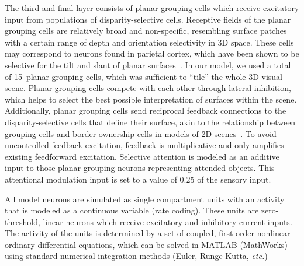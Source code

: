 \documentclass[conference]{IEEEtran}
\newcommand{\etc}[0]{{\em etc.}\xspace}
\begin{document}
The third and final layer consists of planar grouping cells which
receive excitatory input from populations of disparity-selective
cells. Receptive fields of the planar grouping cells are relatively broad and non-specific, resembling surface patches with a certain range of depth and orientation selectivity in 3D space.
These cells may correspond to neurons found 
in parietal cortex, which have been shown to be selective for the tilt
and slant of planar surfaces~\cite{Rosenberg_etal13}. In our model, we
used a total of 15~planar grouping cells, which was sufficient to ``tile''
the whole 3D visual scene. Planar grouping cells compete with each
other through lateral inhibition, which helps to select the best
possible interpretation of surfaces within the scene. Additionally,
planar grouping cells send reciprocal feedback connections to the
disparity-selective cells that define their surface, akin to the
relationship between grouping cells and border ownership cells in
models of 2D scenes~\cite{Craft_etal07,Mihalas_etal11b}. To avoid
uncontrolled feedback excitation, feedback is multiplicative and only amplifies existing feedforward excitation.
Selective attention is modeled as an additive input to those planar
grouping neurons representing attended objects. This attentional
modulation input is set to a value of 0.25 of the sensory input.

All model neurons are simulated as single compartment units with an
activity that is modeled as a continuous variable (rate coding). These
units are zero-threshold, linear neurons which receive excitatory and
inhibitory current inputs. The activity of the units is determined by
a set of coupled, first-order nonlinear ordinary differential
equations, which can be solved in MATLAB (MathWorks)
using standard numerical integration methods (Euler, Runge-Kutta,
\etc) 
\end{document}
